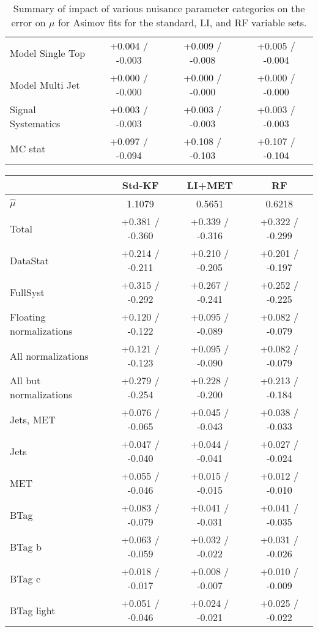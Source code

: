 \begin{table}[!htbp]
\begin{center}
\begin{tabular}{lccc}
Model Single Top &  +0.004 / -0.003  &  +0.009 / -0.008  &  +0.005 / -0.004 \\
Model Multi Jet &  +0.000 / -0.000  &  +0.000 / -0.000  &  +0.000 / -0.000 \\
Signal Systematics &  +0.003 / -0.003  &  +0.003 / -0.003  &  +0.003 / -0.003 \\
MC stat &  +0.097 / -0.094  &  +0.108 / -0.103  &  +0.107 / -0.104 \\
\hline\hline
\end{tabular}
\end{center}
\caption{Summary of impact of various nuisance parameter categories on the error on $\mu$ for Asimov fits for the standard, LI, and RF variable sets.}
\label{tab:asibdvz}
\end{table}

\begin{table}[!htbp]
\begin{center}
\begin{tabular}{lccc}
\hline\hline
 &Std-KF &LI+MET &RF\\
\hline
$\hat{\mu}$ & 1.1079 & 0.5651 & 0.6218\\
\hline
Total &  +0.381 / -0.360  &  +0.339 / -0.316  &  +0.322 / -0.299 \\
\hline
DataStat &  +0.214 / -0.211  &  +0.210 / -0.205  &  +0.201 / -0.197 \\
FullSyst &  +0.315 / -0.292  &  +0.267 / -0.241  &  +0.252 / -0.225 \\
Floating normalizations &  +0.120 / -0.122  &  +0.095 / -0.089  &  +0.082 / -0.079 \\
All normalizations &  +0.121 / -0.123  &  +0.095 / -0.090  &  +0.082 / -0.079 \\
All but normalizations &  +0.279 / -0.254  &  +0.228 / -0.200  &  +0.213 / -0.184 \\
\hline
Jets, MET &  +0.076 / -0.065  &  +0.045 / -0.043  &  +0.038 / -0.033 \\
Jets &  +0.047 / -0.040  &  +0.044 / -0.041  &  +0.027 / -0.024 \\
MET &  +0.055 / -0.046  &  +0.015 / -0.015  &  +0.012 / -0.010 \\
BTag &  +0.083 / -0.079  &  +0.041 / -0.031  &  +0.041 / -0.035 \\
BTag b &  +0.063 / -0.059  &  +0.032 / -0.022  &  +0.031 / -0.026 \\
BTag c &  +0.018 / -0.017  &  +0.008 / -0.007  &  +0.010 / -0.009 \\
BTag light &  +0.051 / -0.046  &  +0.024 / -0.021  &  +0.025 / -0.022 \\

\end{tabular}
\end{center}
\end{table}
